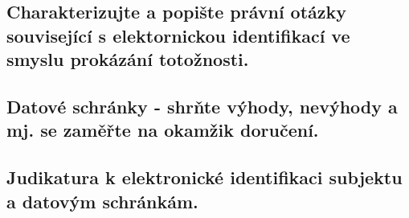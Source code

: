\subsection{Charakterizujte a popište právní otázky související s elektornickou identifikací ve smyslu prokázání totožnosti.}


\subsection{Datové schránky - shrňte výhody, nevýhody a mj. se zaměřte na okamžik doručení.}


\subsection{Judikatura k elektronické identifikaci subjektu a datovým schránkám.}
